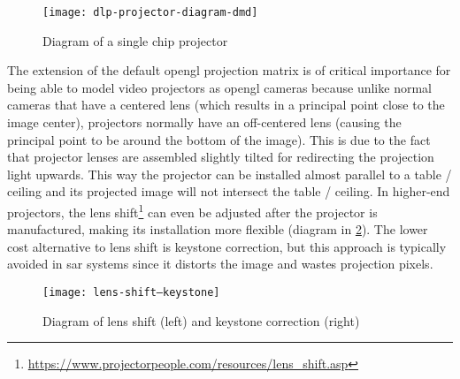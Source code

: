 \vspace{-0.5em}
\begin{figure}[H]
	\centering
	\texttt{[image: dlp-projector-diagram-dmd]}
	\caption[Diagram of a single chip  projector]{Diagram of a single chip  projector\protect\footnotemark}
	\label{fig:dlp-projector-diagram-dmd}
	\vspace{-0.7em}
\end{figure}
\vspace{-0.8em}

The extension of the default \gls{opengl} projection matrix is of critical importance for being able to model video projectors as \gls{opengl} cameras because unlike normal cameras that have a centered lens (which results in a principal point close to the image center), projectors normally have an off-centered lens (causing the principal point to be around the bottom of the image). This is due to the fact that projector lenses are assembled slightly tilted for redirecting the projection light upwards. This way the projector can be installed almost parallel to a table / ceiling and its projected image will not intersect the table / ceiling. In higher-end projectors, the lens shift\footnote{\url{https://www.projectorpeople.com/resources/lens_shift.asp}} can even be adjusted after the projector is manufactured, making its installation more flexible (diagram in \cref{fig:lens-shift--keystone}). The lower cost alternative to lens shift is keystone correction, but this approach is typically avoided in \gls{sar} systems since it distorts the image and wastes projection pixels.

\vspace{-0.5em}
\begin{figure}[H]
	\centering
	\texttt{[image: lens-shift--keystone]}
	\caption[Diagram of lens shift (left) and keystone correction (right)]{Diagram of lens shift (left) and keystone correction (right)\protect\footnotemark}
	\label{fig:lens-shift--keystone}
	\vspace{-0.7em}
\end{figure}
\vspace{-1em}

